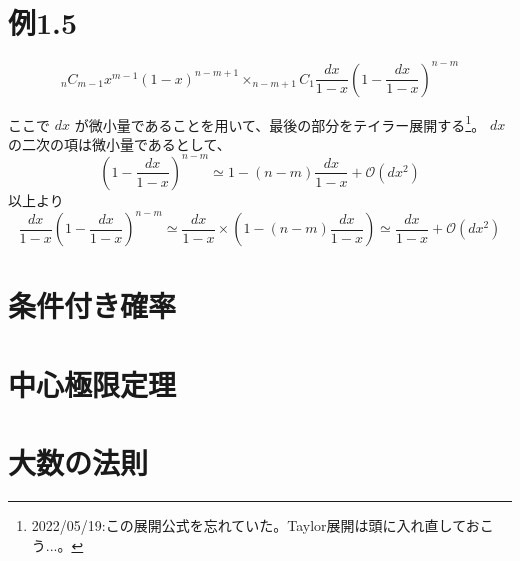 \documentclass[10pt,a4paper]{jsarticle}
\begin{document}
\section{例1.5}

\begin{equation}
    _nC_{m-1}x^{m-1}(1-x)^{n-m+1}\times _{n-m+1}C_1\frac{dx}{1-x}\left(1-\frac{dx}{1-x}\right)^{n-m}
\end{equation}

ここで $dx$ が微小量であることを用いて、最後の部分をテイラー展開する\footnote{2022/05/19:この展開公式を忘れていた。Taylor展開は頭に入れ直しておこう...。}。
$dx$の二次の項は微小量であるとして、
\begin{equation}
  \left(1-\frac{dx}{1-x}\right)^{n-m} \simeq 1-(n-m)\frac{dx}{1-x} + \mathcal{O}\left(dx^2\right)
\end{equation}
以上より
\begin{equation}
\frac{dx}{1-x}\left(1-\frac{dx}{1-x}\right)^{n-m} \simeq \frac{dx}{1-x} \times \left( 1-(n-m)\frac{dx}{1-x} \right) \simeq \frac{dx}{1-x} + \mathcal{O}\left(dx^2\right)
\end{equation}

\section{条件付き確率}
\section{中心極限定理}
\section{大数の法則}
\end{document}
